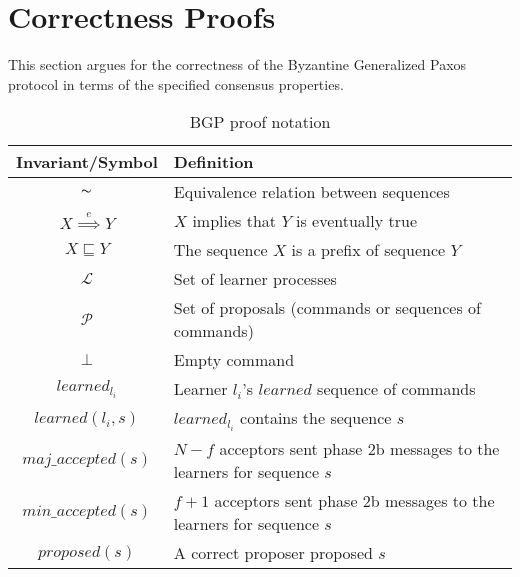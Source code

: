 \section{Correctness Proofs} \label{bft_proof}

This section argues for the correctness of the Byzantine Generalized Paxos protocol in terms of the specified consensus properties.\par

\begin{table}[h!]
	\renewcommand{\arraystretch}{1.5}
	\centering
	\begin{tabularx}{\linewidth}{ |c|X|}
		\hline
		Invariant/Symbol & Definition \\
		\hline
		$\thicksim$ & Equivalence relation between sequences \\
		\hline
		$X \overset{e}{\implies} Y$ & $X$ implies that $Y$ is eventually true \\
		\hline
		$X \sqsubseteq Y$ & The sequence $X$ is a prefix of sequence $Y$ \\
		\hline
		$\mathcal{L}$ & Set of learner processes \\
		\hline
		$\mathcal{P}$ & Set of proposals (commands or sequences of commands) \\
		\hline
		$\bot$ & Empty command \\
		\hline		
		$learned_{l_i}$ & Learner $l_i$'s $learned$ sequence of commands \\
		\hline
		$learned(l_i,s)$ & $learned_{l_i}$ contains the sequence $s$ \\
		\hline
		$maj\_accepted(s)$ & $N-f$ acceptors sent phase 2b messages to the learners for sequence $s$ \\
		\hline
		$min\_accepted(s)$ & $f+1$ acceptors sent phase 2b messages to the learners for sequence $s$ \\
		\hline
		$proposed(s)$ & A correct proposer proposed $s$ \\
		\hline
		
	\end{tabularx} 
	\vspace{\smallskipamount}
	\caption{BGP proof notation} 
	\label{table:bft_proof}
\end{table}

